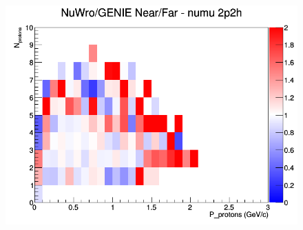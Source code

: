 \begin{figure}[h]
\endminipage
{}
\includegraphics[width=\linewidth]{N_P/nominal/protons/ratios/2p2h_NuWro_GENIE_numu_NF_N_P.png}
\endminipage
\newline
\end{figure}
\clearpage
